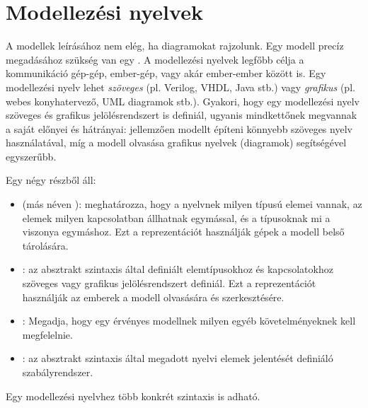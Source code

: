 %
%

\section{Modellezési nyelvek}

A modellek leírásához nem elég, ha diagramokat rajzolunk. Egy modell precíz megadásához szükség van egy . A modellezési nyelvek legfőbb célja a kommunikáció gép-gép, ember-gép, vagy akár ember-ember között is. Egy modellezési nyelv lehet \emph{szöveges} (pl. Verilog, VHDL, Java stb.) vagy \emph{grafikus} (pl. webes konyhatervező, UML diagramok stb.). Gyakori, hogy egy modellezési nyelv szöveges és grafikus jelölésrendszert is definiál, ugyanis mindkettőnek megvannak a saját előnyei és hátrányai: jellemzően modellt építeni könnyebb szöveges nyelv használatával, míg a modell olvasása grafikus nyelvek (diagramok) segítségével egyszerűbb.

\begin{definicio}
	Egy  négy részből áll:
	\begin{itemize}
		\item {} (más néven ): meghatározza, hogy a nyelvnek milyen típusú elemei vannak, az elemek milyen kapcsolatban állhatnak egymással, és a típusoknak mi a viszonya egymáshoz. Ezt a reprezentációt használják gépek a modell belső tárolására.
		\item {}: az absztrakt szintaxis által definiált elemtípusokhoz és kapcsolatokhoz szöveges vagy grafikus jelölésrendszert definiál. Ezt a reprezentációt használják az emberek a modell olvasására és szerkesztésére.
		\item {}: Megadja, hogy egy érvényes modellnek milyen egyéb követelményeknek kell megfelelnie.
		\item {}: az absztrakt szintaxis által megadott nyelvi elemek jelentését definiáló szabályrendszer.
	\end{itemize}
	Egy modellezési nyelvhez több konkrét szintaxis is adható.
\end{definicio}

